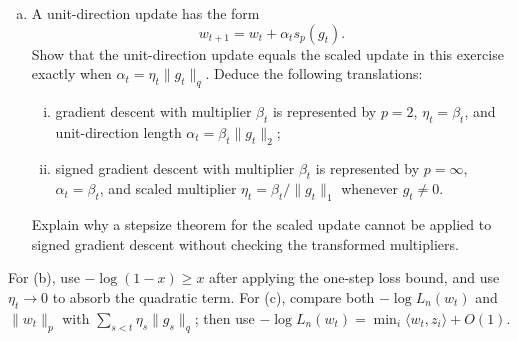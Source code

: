 \begin{exercisechunk}
\begin{enumerate}[(a),beginpenalty=10000]
\item A unit-direction update has the form
\[
 w_{t+1}=w_t+\alpha_t s_p(g_t).
\]
Show that the unit-direction update equals the scaled update in this exercise
exactly when
$\alpha_t=\eta_t\|g_t\|_q$. Deduce the following translations:
\begin{enumerate}[(i)]
\item gradient descent with multiplier $\beta_t$ is represented by $p=2$,
$\eta_t=\beta_t$, and unit-direction length
$\alpha_t=\beta_t\|g_t\|_2$;
\item signed gradient descent with multiplier $\beta_t$ is represented by $p=\infty$,
$\alpha_t=\beta_t$, and scaled multiplier
$\eta_t=\beta_t/\|g_t\|_1$ whenever $g_t\ne0$.
\end{enumerate}
Explain why a stepsize theorem for the scaled update cannot be applied to
signed gradient descent without checking the transformed multipliers.
\end{enumerate}
\begin{hints}
For (b), use $-\log(1-x)\ge x$ after applying the one-step loss bound, and
use $\eta_t\to0$ to absorb the quadratic term. For (c), compare both
$-\log L_n(w_t)$ and $\|w_t\|_p$ with
$\sum_{s<t}\eta_s\|g_s\|_q$; then use
$-\log L_n(w_t)=\min_i\langle w_t,z_i\rangle+O(1)$.
\end{hints}
\end{exercisechunk}
